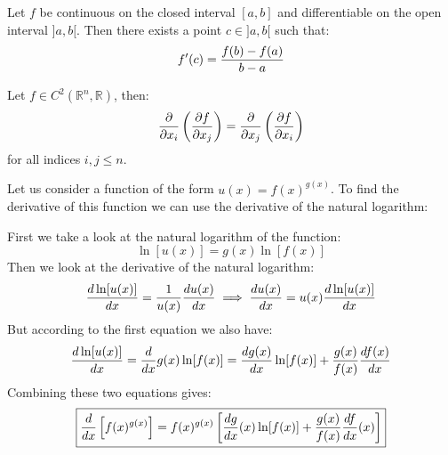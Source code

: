         \begin{theorem}
            	Let $f$ be continuous on the closed interval $[a, b]$ and differentiable on the open interval $]a, b[$. Then there exists a point $c\in]a, b[$ such that:
            	\begin{equation}
            		\label{calculus:mean_value_theorem}
            		f'(c) = \stylefrac{f(b) - f(a)}{b-a}
            	\end{equation}
	\end{theorem}
            
        

	\begin{theorem}
		Let $f\in C^2(\mathbb{R}^n, \mathbb{R})$, then:
		\begin{equation}
			\frac{\partial }{\partial x_i}\left(\frac{\partial f}{\partial x_j}\right) = \frac{\partial }{\partial x_j}\left(\frac{\partial f}{\partial x_i}\right)
		\end{equation}
		for all indices $i, j\leq n$.
	\end{theorem}

	\begin{method}[Derivative of $f(x)^{g(x)}$]
		Let us consider a function of the form $u(x)=f(x)^{g(x)}$. To find the derivative of this function we can use the derivative of the natural logarithm:\par
				
		\noindent First we take a look at the natural logarithm of the function: \[\ln[u(x)] = g(x)\ln[f(x)]\] Then we look at the derivative of the natural logarithm:
		\[\deriv{\ln[u(x)]}{x} = \stylefrac{1}{u(x)}\deriv{u(x)}{x} \implies \deriv{u(x)}{x} = u(x)\deriv{\ln[u(x)]}{x}\]
		But according to the first equation we also have:\[\deriv{\ln[u(x)]}{x} = \deriv{}{x}g(x)\ln[f(x)] = \deriv{g(x)}{x}\ln[f(x)] + \stylefrac{g(x)}{f(x)}\deriv{f(x)}{x}\] Combining these two equations gives:
		\begin{equation}
			\label{calculus:derivative_f^g}
			\boxed{\deriv{}{x}\left[f(x)^{g(x)}\right] = f(x)^{g(x)}\left[\deriv{g}{x}(x)\ln[f(x)] + \stylefrac{g(x)}{f(x)}\deriv{f}{x}(x)\right]}
		\end{equation}
	\end{method}
	
